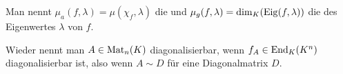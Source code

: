 \begin{definition}
	Man nennt $\mu_a(f,\lambda)=\mu(\chi_f,\lambda)$ die  und $\mu_g(f,\lambda)=\dim_K(\operatorname{Eig}(f,\lambda))$ die   des Eigenwertes $\lambda$ von $f$.
\end{definition}

\begin{remark}
	Wieder nennt man $A\in\operatorname{Mat}_n(K)$ diagonalisierbar, wenn $f_A\in\operatorname{End}_K(K^n)$ diagonalisierbar ist, also wenn $A\sim D$ für eine Diagonalmatrix $D$.
\end{remark}